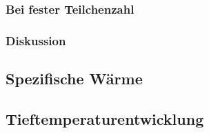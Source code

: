 \fehlt

\subsubsection{Bei fester Teilchenzahl}

\fehlt

\subsubsection{Diskussion}

\fehlt

\subsection{Spezifische Wärme}

\fehlt

\subsection{Tieftemperaturentwicklung}

\fehlt

\IfFileExists{\bibliographyfile}{
    \printbibliography
}{}



